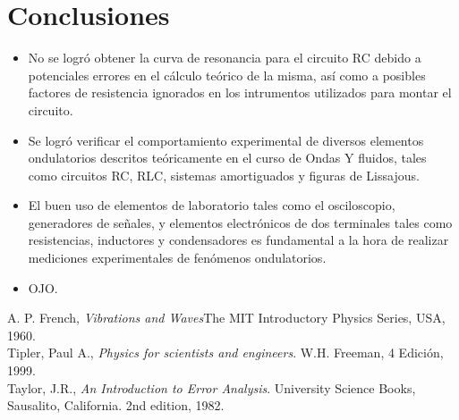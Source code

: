 \documentclass[prb,aps,twocolumn,preprintnumbers,amsmath,amssymb]{revtex4}
\begin{document}
\section{Conclusiones}

\begin{itemize}

	\item No se logró obtener la curva de resonancia para el circuito RC debido a potenciales errores en el cálculo teórico de la misma, así como a posibles factores de resistencia ignorados en los intrumentos utilizados para montar el circuito.
	
	\item Se logró verificar el comportamiento experimental de diversos elementos ondulatorios descritos teóricamente en el curso de Ondas Y fluidos, tales como circuitos RC, RLC, sistemas amortiguados y figuras de Lissajous.
		
	\item El buen uso de elementos de laboratorio tales como el osciloscopio, generadores de señales, y elementos electrónicos de dos terminales tales como resistencias, inductores y condensadores es fundamental a la hora de realizar mediciones experimentales de fenómenos ondulatorios.
	
	\item OJO.
	
\end{itemize}

\begin{thebibliography}{99}
 A. P. French, {\it Vibrations and Waves}{The MIT Introductory Physics Series, USA, 1960}.\\
 Tipler, Paul A., \textit{Physics for scientists and engineers}. W.H. Freeman, 4 Edici\' on, 1999.\\
 Taylor, J.R., \textit{An Introduction to Error Analysis}. University Science Books, Sausalito, California. 2nd edition, 1982.\\
\end{thebibliography}
\end{document}
